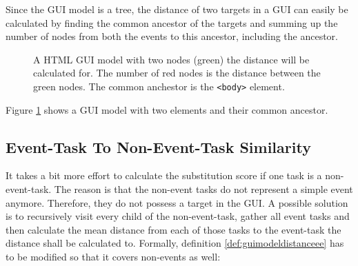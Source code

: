 Since the GUI model is a tree, the distance of two targets in a GUI can easily be calculated by finding the common ancestor of the targets and summing up the number of nodes from both the events to this ancestor, including the ancestor.
\begin{figure}
\begin{center}
\end{center}
\caption{A HTML GUI model with two nodes (green) the distance will be calculated for.  The number of red nodes is the distance between the green nodes. The common anchestor is the \texttt{<body>} element.}
\label{fig:guimodeldistance}

\end{figure}
Figure \ref{fig:guimodeldistance} shows a GUI model with two elements and their common ancestor.


\subsection{Event-Task To Non-Event-Task Similarity}
It takes a bit more effort to calculate the substitution score if one task is a non-event-task.
The reason is that the non-event tasks do not represent a simple event anymore.
Therefore, they do not possess a target in the GUI.
A possible solution is to recursively visit every child of the non-event-task, gather all event tasks and then calculate the mean distance from each of those tasks to the event-task the distance shall be calculated to.
Formally, definition \ref{def:guimodeldistanceee} has to be modified so that it covers non-events as well:

